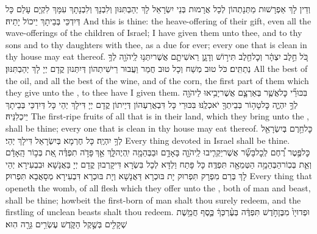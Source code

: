 {וְדֵין לָךְ אַפְרָשׁוּת מַתְּנָתְהוֹן לְכָל אֲרָמוּת בְּנֵי יִשְׂרָאֵל לָךְ יְהַבְתִּנּוּן וְלִבְנָךְ וְלִבְנָתָךְ עִמָּךְ לִקְיָם עָלַם כָּל דְּיִדְכֵּי בְּבֵיתָךְ יֵיכוֹל יָתֵיהּ׃}
{And this is thine: the heave-offering of their gift, even all the wave-offerings of the children of Israel; I have given them unto thee, and to thy sons and to thy daughters with thee, as a due for ever; every one that is clean in thy house may eat thereof.}{}
{כֹּ֚ל חֵ֣לֶב יִצְהָ֔ר וְכׇל\maqqaf חֵ֖לֶב תִּיר֣וֹשׁ וְדָגָ֑ן רֵאשִׁיתָ֛ם אֲשֶׁר\maqqaf יִתְּנ֥וּ לַֽיהֹוָ֖ה לְךָ֥ נְתַתִּֽים׃}
{כֹּל טוּב מְשַׁח וְכָל טוּב חֲמַר וַעֲבוּר רֵישִׁיתְהוֹן דְּיִתְּנוּן קֳדָם יְיָ לָךְ יְהַבְתִּנּוּן׃}
{All the best of the oil, and all the best of the wine, and of the corn, the first part of them which they give unto the \lord, to thee have I given them.}{}
{בִּכּוּרֵ֞י כׇּל\maqqaf אֲשֶׁ֧ר בְּאַרְצָ֛ם אֲשֶׁר\maqqaf יָבִ֥יאוּ לַיהֹוָ֖ה לְךָ֣ יִהְיֶ֑ה כׇּל\maqqaf טָה֥וֹר בְּבֵיתְךָ֖ יֹאכְלֶֽנּוּ׃}
{בִּכּוּרֵי כָּל דִּבְאֲרַעְהוֹן דְּיַיתוֹן קֳדָם יְיָ דִּילָךְ יְהֵי כָּל דְּיִדְכֵּי בְּבֵיתָךְ יֵיכְלִנֵּיהּ׃}
{The first-ripe fruits of all that is in their land, which they bring unto the \lord, shall be thine; every one that is clean in thy house may eat thereof.}{}
{כׇּל\maqqaf חֵ֥רֶם בְּיִשְׂרָאֵ֖ל לְךָ֥ יִהְיֶֽה׃}
{כָּל חֶרְמָא בְּיִשְׂרָאֵל דִּילָךְ יְהֵי׃}
{Every thing devoted in Israel shall be thine.}{}
{כׇּל\maqqaf פֶּ֣טֶר רֶ֠חֶם לְֽכׇל\maqqaf בָּשָׂ֞ר אֲשֶׁר\maqqaf יַקְרִ֧יבוּ לַֽיהֹוָ֛ה בָּאָדָ֥ם וּבַבְּהֵמָ֖ה יִֽהְיֶה\maqqaf לָּ֑ךְ אַ֣ךְ \legarmeh  פָּדֹ֣ה תִפְדֶּ֗ה אֵ֚ת בְּכ֣וֹר הָֽאָדָ֔ם וְאֵ֛ת בְּכֽוֹר\maqqaf הַבְּהֵמָ֥ה הַטְּמֵאָ֖ה תִּפְדֶּֽה׃}
{כָּל פָּתַח וַלְדָּא לְכָל בִּשְׂרָא דִּיקָרְבוּן קֳדָם יְיָ בַּאֲנָשָׁא וּבִבְעִירָא יְהֵי לָךְ בְּרַם מִפְרָק תִּפְרוּק יָת בּוּכְרָא דַּאֲנָשָׁא וְיָת בּוּכְרָא דִּבְעִירָא מְסָאֲבָא תִּפְרוּק׃}
{Every thing that openeth the womb, of all flesh which they offer unto the \lord, both of man and beast, shall be thine; howbeit the first-born of man shalt thou surely redeem, and the firstling of unclean beasts shalt thou redeem.}{}
{וּפְדוּיָו֙ מִבֶּן\maqqaf חֹ֣דֶשׁ תִּפְדֶּ֔ה בְּעֶ֨רְכְּךָ֔ כֶּ֛סֶף חֲמֵ֥שֶׁת שְׁקָלִ֖ים בְּשֶׁ֣קֶל הַקֹּ֑דֶשׁ עֶשְׂרִ֥ים גֵּרָ֖ה הֽוּא׃}

